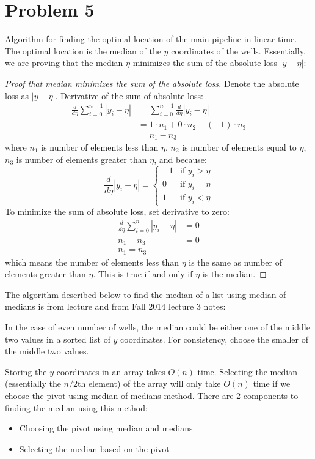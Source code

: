 \documentclass{article}
\begin{document}
\pagebreak

\section*{Problem 5}
Algorithm for finding the optimal location of the main pipeline in linear time. The optimal location is the median of the $y$ coordinates of the wells. Essentially, we are proving that the median $\eta$ minimizes the sum of the absolute loss $|y-\eta|$:
\begin{mdframed}
\begin{proof}[Proof that median minimizes the sum of the absolute loss]
Denote the absolute loss as $|y-\eta|$. Derivative of the sum of absolute loss:
\begin{align*}
\frac{d}{d \eta}\sum_{i=0}^{n-1} |y_i-\eta|&=\sum_{i=0}^{n-1} \frac{d}{d \eta}|y_i-\eta| \\
&=1\cdot n_1 + 0\cdot n_2 + (-1)\cdot n_3 \\
&=n_1-n_3
\end{align*}
where $n_1$ is number of elements less than $\eta$, $n_2$ is number of elements equal to  $\eta$, $n_3$ is number of elements greater than $\eta$, and because:
$$ \frac{d}{d \eta}|y_i-\eta| =
\begin{cases}
-1 & \text{if } y_i > \eta \\
0 & \text{if } y_i=\eta \\
1 & \text{if } y_i<\eta
\end{cases}$$
To minimize the sum of absolute loss, set derivative to zero:
\begin{align*}
\frac{d}{d \eta}\sum_{i=0}^{n} |y_i-\eta|&=0 \\
n_1-n_3&=0 \\
n_1=n_3
\end{align*}
which means the number of elements less than $\eta$ is the same as number of elements greater than $\eta$. This is true if and only if $\eta$ is the median.
\end{proof}
\end{mdframed}
The algorithm described below to find the median of a list using median of medians is from lecture and from Fall 2014 lecture 3 notes:

In the case of even number of wells, the median could be either one of the middle two values in a sorted list of $y$ coordinates. For consistency, choose the smaller of  the middle two values.

Storing the $y$ coordinates in an array takes $O(n)$ time. Selecting the median (essentially the $n/2$th element) of the array will only take $O(n)$ time if we choose the pivot using median of medians method. There are 2 components to finding the median using this method:
\begin{itemize}
\item Choosing the pivot using median and medians
\item Selecting the median based on the pivot
\end{itemize}
\end{document}
